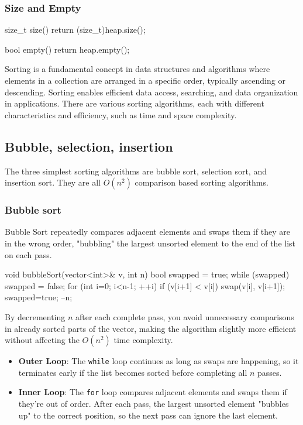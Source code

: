 \documentclass{report}
\begin{document}
\pagebreak 
\subsubsection{Size and Empty}
\bigbreak \noindent 
\begin{cppcode}
    size_t size() {
        return (size_t)heap.size();
    }

    bool empty() {
        return heap.empty();
    }
\end{cppcode}

\pagebreak 
{}
\bigbreak \noindent 
Sorting is a fundamental concept in data structures and algorithms where elements in a collection are arranged in a specific order, typically ascending or descending. Sorting enables efficient data access, searching, and data organization in applications. There are various sorting algorithms, each with different characteristics and efficiency, such as time and space complexity.
\bigbreak \noindent 
\subsection{Bubble, selection, insertion}
\bigbreak \noindent 
The three simplest sorting algorithms are bubble sort, selection sort, and insertion sort. They are all $O(n^{2})$ comparison based sorting algorithms.
\bigbreak \noindent 
\subsubsection{Bubble sort}
\bigbreak \noindent 
Bubble Sort repeatedly compares adjacent elements and swaps them if they are in the wrong order, "bubbling" the largest unsorted element to the end of the list on each pass.
\bigbreak \noindent 
\begin{cppcode}
    void bubbleSort(vector<int>& v, int n) {
        bool swapped = true;
        while (swapped) {
            swapped = false;
            for (int i=0; i<n-1; ++i) {
                if (v[i+1] < v[i]) {
                    swap(v[i], v[i+1]);
                    swapped=true;
                }
            }
            --n;
        }
    }
\end{cppcode}
\bigbreak \noindent 
By decrementing \( n \) after each complete pass, you avoid unnecessary comparisons in already sorted parts of the vector, making the algorithm slightly more efficient without affecting the \( O(n^2) \) time complexity.
\begin{itemize}
    \item \textbf{Outer Loop}: The \texttt{while} loop continues as long as swaps are happening, so it terminates early if the list becomes sorted before completing all \( n \) passes.
    \item \textbf{Inner Loop}: The \texttt{for} loop compares adjacent elements and swaps them if they’re out of order. After each pass, the largest unsorted element "bubbles up" to the correct position, so the next pass can ignore the last element.
\end{itemize}
\pagebreak \bigbreak \noindent 
\end{document}
